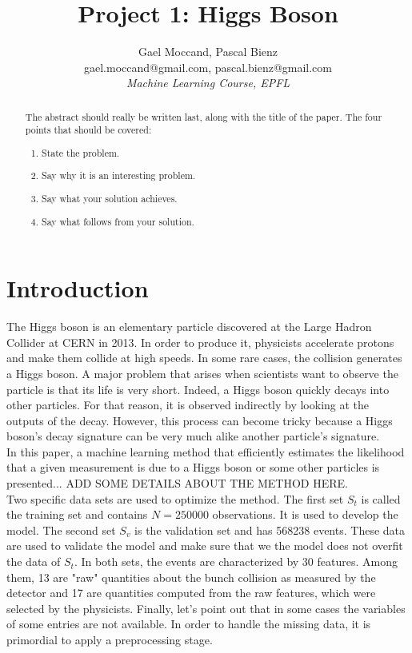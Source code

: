 \documentclass[10pt,conference,compsocconf]{IEEEtran}
\begin{document}
\title{Project 1: Higgs Boson}

\author{
  Gael Moccand, Pascal Bienz\\
  gael.moccand@gmail.com, pascal.bienz@gmail.com\\
  \textit{Machine Learning Course, EPFL}
}

\maketitle

\begin{abstract}
The abstract should really be written last, along with the title of
the paper. The four points that should be covered:
\begin{enumerate}
\item State the problem.
\item Say why it is an interesting problem.
\item Say what your solution achieves.
\item Say what follows from your solution.
\end{enumerate}
\end{abstract}

\section{Introduction}
The Higgs boson is an elementary particle discovered at the Large Hadron Collider at CERN in 2013. In order to produce it, physicists accelerate protons and make them collide at high speeds. In some rare cases, the collision generates a Higgs boson. A major problem that arises when scientists want to observe the particle is that its life is very short. Indeed, a Higgs boson quickly decays into other particles. For that reason, it is observed indirectly by looking at the outputs of the decay. However, this process can become tricky because a Higgs boson's decay signature can be very much alike another particle's signature.\\
In this paper, a machine learning method that efficiently estimates the likelihood that a given measurement is due to a Higgs boson or some other particles is presented... ADD SOME DETAILS ABOUT THE METHOD HERE.\\
Two specific data sets are used to optimize the method. The first set $S_{t}$ is called the training set and contains $N=250000$ observations. It is used to develop the model. The second set $S_{v}$ is the validation set and has 568238 events. These data are used to validate the model and make sure that we the model does not overfit the data of $S_t$. In both sets, the events are characterized by 30 features. Among them, 13 are "raw" quantities about the bunch collision as measured by the detector and 17 are quantities computed from the raw features, which were selected by the physicists. Finally, let's point out that in some cases the variables of some entries are not available. In order to handle the missing data, it is primordial to apply a preprocessing stage.
\end{document}
